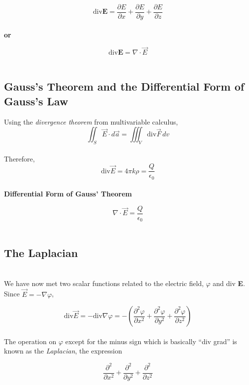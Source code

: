\documentclass[svgnames]{article}
\begin{document}
\[ \text{div} \textbf{E} = \frac{\partial E}{\partial x} + \frac{\partial
E}{\partial y} + \frac{\partial E}{\partial z} \]\\

\textbf{or} 

\[ \text{div} \textbf{E} = \nabla \cdot \vec{E} \] \\

\subsection{Gauss's Theorem and the Differential Form of Gauss's Law}

Using the \textit{divergence theorem} from multivariable calculus, \\

\[ \iint_S \vec{E} \cdot d\vec{a} = \iiint_V \text{div} \vec{F} \, dv \]\\ 

Therefore,  \\

\[ \text{div} \vec{E} = 4 \pi k \rho = \frac{Q}{\epsilon_0} \] \\

\textbf{Differential Form of Gauss' Theorem} 

\[ \nabla \cdot \vec{E} = \frac{Q}{\epsilon_0} \] \\ 

\subsection{The Laplacian} \mbox{} \\ 

We have now met two scalar functions related to the electric field, $\varphi$ and div \textbf{E}. \\

Since $\vec{E} = -\nabla \varphi$, 

\[ \text{div} \vec{E} = - \text{div} \nabla \varphi = -\left(\frac{\partial^2
\varphi}{\partial x^2} + \frac{\partial^2 \varphi}{\partial y^2}
+ \frac{\partial^2 \varphi}{\partial z^2}\right) \] \\

The operation on $\varphi$ except for the minus sign which is basically ``div
grad'' is known as the \textit{Laplacian}, the expression

\[ \frac{\partial^2}{\partial x^2} + \frac{\partial^2 }{\partial y^2} + \frac{\partial^2}{\partial z^2} \] \\ 
\end{document}
